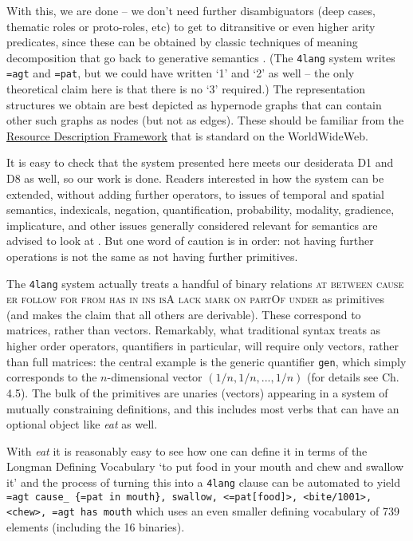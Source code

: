 \documentclass[output=paper,colorlinks=true,citecolor=brown]{langscibook}
\begin{document}
With this, we are done -- we don't need further disambiguators (deep cases,
thematic roles or proto-roles, etc) to get to ditransitive or even higher
arity predicates, since these can be obtained by classic techniques of meaning
decomposition that go back to generative semantics \citep{Kornai:2012}.  (The
\texttt{4lang} system writes \texttt{=agt} and \texttt{=pat}, but we could have
written `1' and `2' as well -- the only theoretical claim here is that there
is no `3' required.) The representation structures we obtain are best depicted
as hypernode graphs that can contain other such graphs as nodes (but not as
edges). These should be familiar from the
\href{https://en.wikipedia.org/wiki/Resource_Description_Framework}{Resource
  Description Framework} that is standard on the WorldWideWeb.

\bigskip\noindent It is easy to check that the system presented here meets our
desiderata D1 and D8 as well, so our work is done. Readers interested in how the
system can be extended, without adding further operators, to issues of
temporal and spatial semantics, indexicals, negation, quantification,
probability, modality, gradience, implicature, and other issues generally
considered relevant for semantics are advised to look at
\citet{Kornai:2022}. But one word of caution is in order: not having further
operations is not the same as not having further primitives.

The \texttt{4lang} system actually treats a handful of binary relations \textsc{at between cause er follow for from has in ins isA lack mark on partOf
  under} as primitives (and makes the claim that all others are
derivable). These correspond to matrices, rather than vectors. Remarkably,
what traditional syntax treats as higher order operators, quantifiers in
particular, will require only vectors, rather than full matrices: the central
example is the generic quantifier \texttt{gen}, which simply corresponds to the
$n$-dimensional vector $(1/n,1/n,...,1/n)$ (for details see
\cite{Kornai:2022} Ch. 4.5). The bulk of the primitives are unaries (vectors)
appearing in a system of mutually constraining definitions, and this includes
most verbs that can have an optional object like \emph{eat} as well.

With \emph{eat} it is reasonably easy to see how one can define it in terms of
the Longman Defining Vocabulary `to put food in your mouth and chew and
swallow it' and the process of turning this into a \texttt{4lang} clause can be
automated \citep{Recski:2016d} to yield \texttt{=agt cause\_ \{=pat in mouth\},
  swallow, <=pat[food]>, <bite/1001>, <chew>, =agt has mouth} which uses an
even smaller defining vocabulary of 739 elements (including the 16 binaries).
\end{document}
